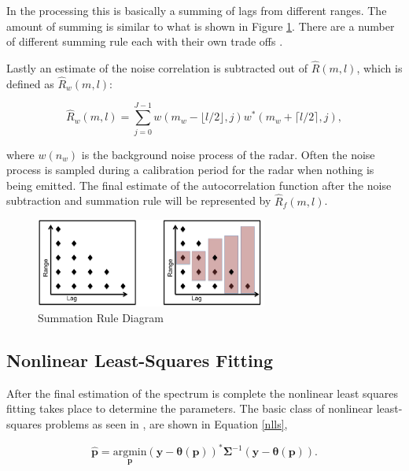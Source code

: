 \documentclass[draft,ras]{agutex}
\begin{document}
\begin{article}
In the processing this is basically a summing of lags from different ranges.  The amount of summing is similar to what is shown in Figure \ref{fig:sumrule}.  There are a number of different summing rule each with their own trade offs \citep{nygren1996}.  

Lastly an estimate of the noise correlation is subtracted out of $\hat{R}(m,l)$, which is defined as $\hat{R}_w(m,l)$:

\begin{equation}
\label{lagpro}
\hat{R}_w(m,l) = \displaystyle\sum\limits_{j=0}^{J-1} w(m_w-\lfloor l/2\rfloor,j)w^*(m_w+\lceil l/2 \rceil,j),
\end{equation}

\noindent where $w(n_w)$ is the background noise process of the radar.  Often the noise process is sampled during a calibration period for the radar when nothing is being emitted.  The final estimate of the autocorrelation function after the noise subtraction and summation rule will be represented by $\hat{R}_f(m,l)$.
\begin{figure}[!t]
\centering
\includegraphics[width=3in]{sumrule}
\caption{Summation Rule Diagram}
\label{fig:sumrule}
\end{figure}

\subsection{Nonlinear Least-Squares Fitting}
After the final estimation of the spectrum is complete the nonlinear least squares fitting takes place to determine the parameters.  The basic class of nonlinear least-squares problems as seen in \citep{kayvol1}, are shown in Equation \ref{nlls},

\begin{equation}
	\hat{\mathbf{p}}= \underset{\mathbf{p}}{\text{argmin}} (\mathbf{y}-\bm{\theta}(\mathbf{p}))^*\bm{\Sigma}^{-1}(\mathbf{y}-\bm{\theta}(\mathbf{p})).
\label{nlls}
\end{equation}


\end{article}
\end{document}
